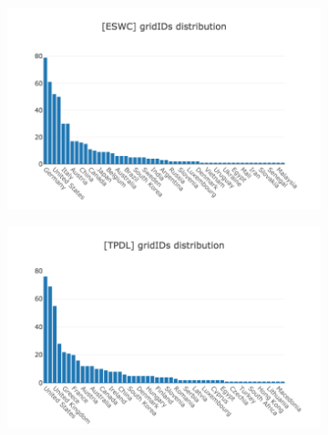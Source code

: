 \documentclass{llncs}
\begin{document}
\begin{figure}[h]
\begin{subfigure}{.5\textwidth}
    \includegraphics[width=\textwidth]{images/eswc_gridids_longtail.png}
	\caption[ ]{}
	\label{fig:eswc_gridids_longtail}
\end{subfigure}
\centering
\begin{subfigure}{.5\textwidth}
	\centering
    \includegraphics[width=\textwidth]{images/tpdl_gridids_longtail.png}

\end{subfigure}
\end{figure}
\end{document}
